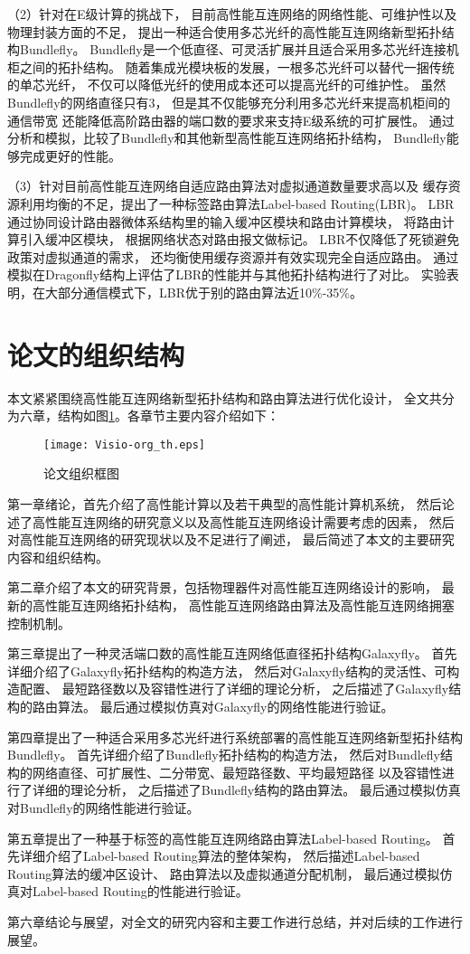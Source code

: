 （2）针对在E级计算的挑战下，
目前高性能互连网络的网络性能、可维护性以及物理封装方面的不足，
提出一种适合使用多芯光纤的高性能互连网络新型拓扑结构Bundlefly。
Bundlefly是一个低直径、可灵活扩展并且适合采用多芯光纤连接机柜之间的拓扑结构。
随着集成光模块板的发展，一根多芯光纤可以替代一捆传统的单芯光纤，
不仅可以降低光纤的使用成本还可以提高光纤的可维护性。
虽然Bundlefly的网络直径只有3，
但是其不仅能够充分利用多芯光纤来提高机柜间的通信带宽
还能降低高阶路由器的端口数的要求来支持E级系统的可扩展性。
通过分析和模拟，比较了Bundlefly和其他新型高性能互连网络拓扑结构，
Bundlefly能够完成更好的性能。

（3）针对目前高性能互连网络自适应路由算法对虚拟通道数量要求高以及
缓存资源利用均衡的不足，提出了一种标签路由算法Label-based Routing(LBR)。
LBR通过协同设计路由器微体系结构里的输入缓冲区模块和路由计算模块，
将路由计算引入缓冲区模块，
根据网络状态对路由报文做标记。
LBR不仅降低了死锁避免政策对虚拟通道的需求，
还均衡使用缓存资源并有效实现完全自适应路由。
通过模拟在Dragonfly结构上评估了LBR的性能并与其他拓扑结构进行了对比。
实验表明，在大部分通信模式下，LBR优于别的路由算法近10\%-35\%。

\section{论文的组织结构}

本文紧紧围绕高性能互连网络新型拓扑结构和路由算法进行优化设计，
全文共分为六章，结构如图\ref{orgth}。各章节主要内容介绍如下：

\begin{figure}[htp]
\centering
\texttt{[image: Visio-org\_th.eps]}
\caption{论文组织框图}
\label{orgth}
\end{figure}

第一章绪论，首先介绍了高性能计算以及若干典型的高性能计算机系统，
然后论述了高性能互连网络的研究意义以及高性能互连网络设计需要考虑的因素，
然后对高性能互连网络的研究现状以及不足进行了阐述，
最后简述了本文的主要研究内容和组织结构。

第二章介绍了本文的研究背景，包括物理器件对高性能互连网络设计的影响，
最新的高性能互连网络拓扑结构，
高性能互连网络路由算法及高性能互连网络拥塞控制机制。

第三章提出了一种灵活端口数的高性能互连网络低直径拓扑结构Galaxyfly。
首先详细介绍了Galaxyfly拓扑结构的构造方法，
然后对Galaxyfly结构的灵活性、可构造配置、
最短路径数以及容错性进行了详细的理论分析，
之后描述了Galaxyfly结构的路由算法。
最后通过模拟仿真对Galaxyfly的网络性能进行验证。

第四章提出了一种适合采用多芯光纤进行系统部署的高性能互连网络新型拓扑结构Bundlefly。
首先详细介绍了Bundlefly拓扑结构的构造方法，
然后对Bundlefly结构的网络直径、可扩展性、二分带宽、最短路径数、平均最短路径
以及容错性进行了详细的理论分析，
之后描述了Bundlefly结构的路由算法。
最后通过模拟仿真对Bundlefly的网络性能进行验证。

第五章提出了一种基于标签的高性能互连网络路由算法Label-based Routing。
首先详细介绍了Label-based Routing算法的整体架构，
然后描述Label-based Routing算法的缓冲区设计、
路由算法以及虚拟通道分配机制，
最后通过模拟仿真对Label-based Routing的性能进行验证。

第六章结论与展望，对全文的研究内容和主要工作进行总结，并对后续的工作进行展望。
